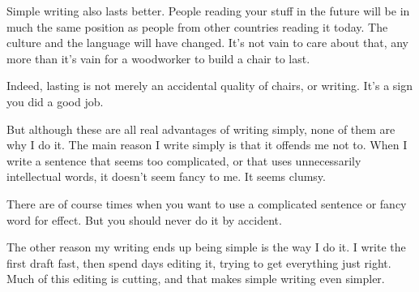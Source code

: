 Simple writing also lasts better.
                  People reading your stuff in the future will be in much the
                  same position as people from other countries reading it today.
                  The culture and the language will have changed. It's not vain
                  to care about that, any more than it's vain for a woodworker
                  to build a chair to last.

Indeed, lasting is not
                  merely an accidental quality of chairs, or writing. It's a
                  sign you did a good job.

But although these are all
                  real advantages of writing simply, none of them are why I do
                  it. The main reason I write simply is that it offends me not
                  to. When I write a sentence that seems too complicated, or
                  that uses unnecessarily intellectual words, it doesn't seem
                  fancy to me. It seems clumsy.

There are of course
                  times when you want to use a complicated sentence or fancy
                  word for effect. But you should never do it by accident.

The
                  other reason my writing ends up being simple is the way I do
                  it. I write the first draft fast, then spend days editing it,
                  trying to get everything just right. Much of this editing is
                  cutting, and that makes simple writing even simpler.


              
            
          
            
              
                


                  
              
            
          
